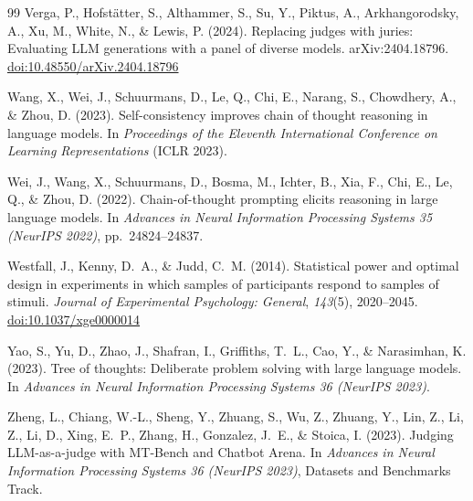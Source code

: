 \documentclass[12pt,a4paper]{article}
\begin{document}
\begin{thebibliography}{99}
Verga, P., Hofst\"atter, S., Althammer, S., Su, Y., Piktus, A.,
  Arkhangorodsky, A., Xu, M., White, N., \& Lewis, P. (2024).
Replacing judges with juries: Evaluating LLM generations with a panel of diverse
  models.
arXiv:2404.18796.
\href{https://doi.org/10.48550/arXiv.2404.18796}{doi:10.48550/arXiv.2404.18796}

Wang, X., Wei, J., Schuurmans, D., Le, Q., Chi, E., Narang, S., Chowdhery, A.,
  \& Zhou, D. (2023).
Self-consistency improves chain of thought reasoning in language models.
In \textit{Proceedings of the Eleventh International Conference on Learning
  Representations} (ICLR 2023).

Wei, J., Wang, X., Schuurmans, D., Bosma, M., Ichter, B., Xia, F., Chi, E.,
  Le, Q., \& Zhou, D. (2022).
Chain-of-thought prompting elicits reasoning in large language models.
In \textit{Advances in Neural Information Processing Systems 35 (NeurIPS 2022)},
  pp.~24824--24837.

Westfall, J., Kenny, D.~A., \& Judd, C.~M. (2014).
Statistical power and optimal design in experiments in which samples of
  participants respond to samples of stimuli.
\textit{Journal of Experimental Psychology: General}, \textit{143}(5),
  2020--2045.
\href{https://doi.org/10.1037/xge0000014}{doi:10.1037/xge0000014}

Yao, S., Yu, D., Zhao, J., Shafran, I., Griffiths, T.~L., Cao, Y., \&
  Narasimhan, K. (2023).
Tree of thoughts: Deliberate problem solving with large language models.
In \textit{Advances in Neural Information Processing Systems 36 (NeurIPS 2023)}.

Zheng, L., Chiang, W.-L., Sheng, Y., Zhuang, S., Wu, Z., Zhuang, Y., Lin, Z.,
  Li, Z., Li, D., Xing, E.~P., Zhang, H., Gonzalez, J.~E., \& Stoica, I.
  (2023).
Judging LLM-as-a-judge with MT-Bench and Chatbot Arena.
In \textit{Advances in Neural Information Processing Systems 36 (NeurIPS 2023)},
  Datasets and Benchmarks Track.

\end{thebibliography}


\clearpage
\end{document}
